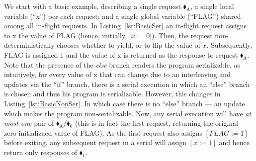 We start with a basic example, describing a single request {\color{ForestGreen}$\blacklozenge_\text{A}$}, a single local variable (``x'') per each request; and a single global variable (``FLAG'') shared among all in-flight requests. 
%
In Listing~\ref{lst:BasicSer} an in-flight request assigns to x the value of FLAG (hence, initially, [$x:=0$]). Then, the request non-deterministically chooses whether to yield, or to flip the value of $x$. Subsequently, FLAG is assigned 1 and the value of x is returned as the response to request {\color{ForestGreen}$\blacklozenge_\text{A}$}. 
%
Note that the presence of the \textit{else} branch renders the program serializable, as intuitively, for every value of x that can change due to an interleaving and updates via the ``if'' branch, there is a serial execution in which an ``else'' branch is chosen and thus his program is serializable.
%
However, this changes in  Listing~\ref{lst:BasicNonSer}.
%
%
%
%
%
%
%
%
%
In which case there is no ``else'' branch --- an update which makes the program non-serializable.
%
Now, any serial execution will have \textit{at most one} pair of {\color{ForestGreen}$\blacklozenge_\text{A}$}/{\color{red}$\blacklozenge_0$} (this is in fact the first request, returning the original zero-initializaed value of FLAG).
%
As the first request also assigns $[FLAG:=1]$ before exiting, any subsequent request in a serial will assign $[x:=1]$ and hence return only responses of {\color{red}$\blacklozenge_1$}. 
